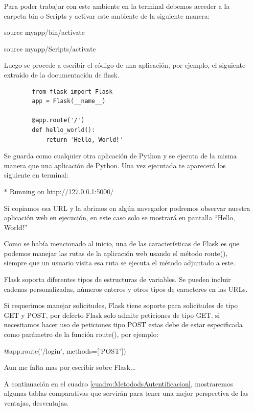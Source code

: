 \documentclass[12pt, a4paper, titlepage]{report}
\begin{document}
		Para poder trabajar con este ambiente en la terminal debemos acceder a la carpeta bin o Scripts y activar este ambiente de la siguiente manera:\par
		\begin{center}
		source myapp/bin/actívate\par
		source myapp/Scripts/activate
		\end{center}
		Luego se procede a escribir el código de una aplicación, por ejemplo, el siguiente extraído de la documentación de flask.\cite{refFlask1}
		\begin{verbatim}
		from flask import Flask  
		app = Flask(__name__) 

		@app.route('/')  
		def hello_world():  
		    return 'Hello, World!'  
		\end{verbatim}
		Se guarda como cualquier otra aplicación de Python y se ejecuta de la misma manera que una aplicación de Python. Una vez ejecutada te aparecerá los siguiente en terminal:\par
		\begin{center}
		* Running on http://127.0.0.1:5000/
		\end{center}
		Si copiamos esa URL y la abrimos en algún navegador podremos observar nuestra aplicación web en ejecución, en este caso solo se mostrará en pantalla “Hello, World!”\par
		Como se había mencionado al inicio, una de las características de Flask es que podemos manejar las rutas de la aplicación web usando el método route(), siempre que un usuario visita esa ruta se ejecuta el método adjuntado a este.\par
		Flask soporta diferentes tipos de estructuras de variables. Se pueden incluir cadenas personalizadas, números enteros y otros tipos de caracteres en las URLs.\par
		Si requerimos manejar solicitudes, Flask tiene soporte para solicitudes de tipo GET y POST, por defecto Flask solo admite peticiones de tipo GET, si necesitamos hacer uso de peticiones tipo POST estas debe de estar especificada como parámetro de la función route(), por ejemplo:\par
		\begin{center}
		@app.route('/login', methods=['POST'])
		\end{center}
		Aun me falta mas por escribir sobre Flask...

	    A continuación en el cuadro \ref{cuadro:MetododsAutentificacion}, mostraremos algunas tablas comparativas que servirán para tener una mejor perspectiva de las ventajas, desventajas.
		
\end{document}
